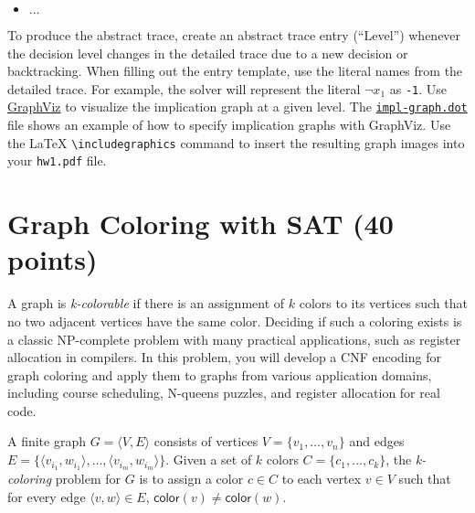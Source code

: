 \documentclass{handout}
\begin{document}
\begin{questions}
\begin{itemize}
\begin{itemize}
  	\end{itemize}
\item $\ldots$
\end{itemize}

To produce the abstract trace, create an abstract trace  entry (``Level'') whenever the decision level changes in the detailed trace due to a new decision or backtracking. When filling out the entry template, use the literal names from the detailed trace. For example, the solver will represent the literal $\neg x_1$ as \texttt{-1}. Use \href{https://www.graphviz.org}{GraphViz} to visualize the implication graph at a given level. The  \href{\gitlab/tree/master/hw1/sat/impl-graph.dot}{\texttt{impl-graph.dot}} file shows an example of how to specify implication graphs with GraphViz. Use the LaTeX \texttt{\textbackslash includegraphics} command to insert the resulting graph images into your \texttt{hw1.pdf} file.





\end{questions}



\pagebreak

\section{Graph Coloring with SAT (40 points)}\label{coloring}

A graph is \emph{k-colorable} if there is an assignment of $k$ colors to its vertices such that no two adjacent vertices have the same color.  Deciding if such a coloring exists is a classic NP-complete problem with many practical applications, such as register allocation in compilers.  In this problem, you will develop a CNF encoding for graph coloring and apply them to graphs from various application domains, including course scheduling, N-queens puzzles, and register allocation for real code.

A finite graph $G = \langle V, E\rangle$ consists of vertices $V=\{v_1,\ldots,v_n\}$ and edges $E=\{\langle v_{i_1}, w_{i_1}\rangle,\ldots,\langle v_{i_m}, w_{i_m}\rangle\}$.  Given a set of $k$ colors $C=\{c_1,\ldots,c_k\}$, the \emph{k-coloring} problem for $G$ is to assign a color $c\in C$  to each vertex $v\in V$ such that for every edge $\langle v,w\rangle\in E$, $\mathsf{color}(v)\neq\mathsf{color}(w)$.
\end{document}
